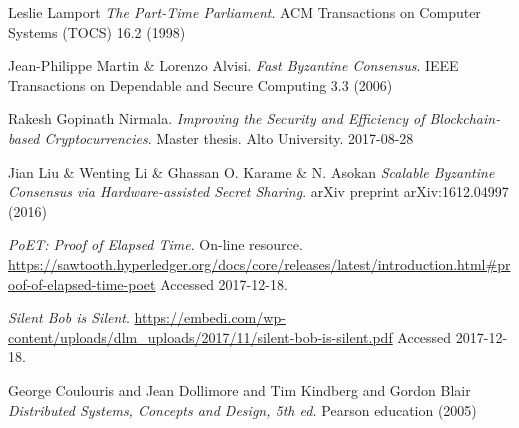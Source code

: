 \documentclass[12pt]{article}
\begin{document}
\begin{thebibliography}{9}
		Leslie Lamport
		\textit{The Part-Time Parliament}.
		ACM Transactions on Computer Systems (TOCS) 16.2 (1998)

		Jean-Philippe Martin \& Lorenzo Alvisi.
		\textit{Fast Byzantine Consensus}.
		IEEE Transactions on Dependable and Secure Computing 3.3 (2006)

		Rakesh Gopinath Nirmala.
		\textit{Improving the Security and Efficiency of Blockchain-based Cryptocurrencies}. 
		Master thesis. Alto University. 2017-08-28

		Jian Liu \& Wenting Li \& Ghassan O. Karame \& N. Asokan
 		\textit{Scalable Byzantine Consensus via Hardware-assisted Secret Sharing}.
 		arXiv preprint arXiv:1612.04997 (2016)

		\textit{PoET: Proof of Elapsed Time}.
		On-line resource. 
		\url{https://sawtooth.hyperledger.org/docs/core/releases/latest/introduction.html#proof-of-elapsed-time-poet}
		Accessed 2017-12-18.

	    \textit{Silent Bob is Silent}.
	    \url{https://embedi.com/wp-content/uploads/dlm_uploads/2017/11/silent-bob-is-silent.pdf}
		Accessed 2017-12-18.

		George Coulouris and Jean Dollimore and Tim Kindberg and Gordon Blair
		\textit{Distributed Systems, Concepts and Design, 5th ed.}
		Pearson education (2005)
	\end{thebibliography}
\end{document}

